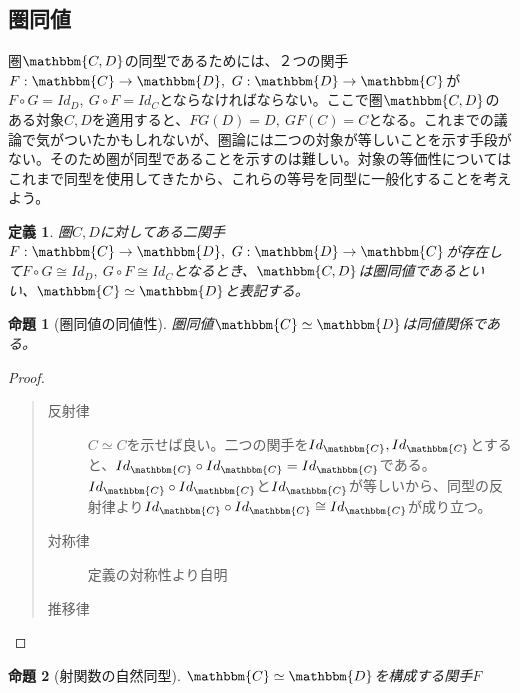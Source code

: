 \documentclass[uplatex,dvipdfmx]{jsarticle}
\newcommand{\cat}[1]{\mathbbm{#1}}
\newcommand{\arrow}{\rightarrow}
\newcommand{\functor}[3]{#1:\cat{#2}\arrow \cat{#3}}
\newtheorem{proof}{証明}[section]
\newtheorem{prop}{命題}[section]
\newtheorem{define}{定義}[section]
\numberwithin{proof}{subsection}
\numberwithin{prop}{subsection}
\numberwithin{define}{subsection}
\begin{document}
  \subsection{圏同値}
  圏$\cat{C,D}$の同型であるためには、２つの関手$\functor{F}{C}{D},\ \functor{G}{D}{C}$が$F\circ G=Id_D,\ G\circ F=Id_C$とならなければならない。ここで圏$\cat{C,D}$のある対象$C,D$を適用すると、$FG(D)=D,\ GF(C)=C$となる。これまでの議論で気がついたかもしれないが、圏論には二つの対象が等しいことを示す手段がない。そのため圏が同型であることを示すのは難しい。対象の等価性についてはこれまで同型を使用してきたから、これらの等号を同型に一般化することを考えよう。\\
  \begin{define}
    圏$C,D$に対してある二関手$\functor{F}{C}{D},\ \functor{G}{D}{C}$が存在して$F\circ G\cong Id_D,\ G\circ F\cong Id_C$となるとき、$\cat{C,D}$は圏同値であるといい、$\cat{C}\simeq \cat{D}$と表記する。
  \end{define}
  \begin{prop}[圏同値の同値性]
    圏同値$\cat{C}\simeq \cat{D}$は同値関係である。
  \end{prop}
  \begin{proof}
    \begin{quote}
			\begin{description}
				\item[反射律] $C\simeq C$を示せば良い。二つの関手を$Id_\cat{C},Id_\cat{C}$とすると、$Id_\cat{C}\circ Id_\cat{C}=Id_\cat{C}$である。$Id_\cat{C}\circ Id_\cat{C}$と$Id_\cat{C}$が等しいから、同型の反射律より$Id_\cat{C}\circ Id_\cat{C}\cong Id_\cat{C}$が成り立つ。
				\item[対称律]定義の対称性より自明
				\item[推移律]
      \end{description}
    \end{quote}
  \end{proof}
  \begin{prop}[射関数の自然同型]
    $\cat{C}\simeq\cat{D}$を構成する関手$F$
  \end{prop}
\end{document}
